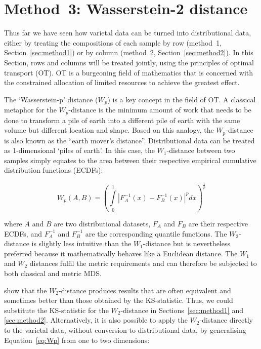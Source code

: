 \documentclass{article}
\begin{document}
\section{Method~3: Wasserstein-2 distance}\label{sec:method3}

Thus far we have seen how varietal data can be turned into
distributional data, either by treating the compositions of each
sample by row (method~1, Section~\ref{sec:method1}) or by column
(method~2, Section~\ref{sec:method2}). In this Section, rows and
columns will be treated jointly, using the principles of optimal
transport (OT). OT is a burgeoning field of mathematics that is
concerned with the constrained allocation of limited resources to
achieve the greatest effect.\medskip

The `Wasserstein-p' distance ($W_p$) is a key concept in the field of
OT. A classical metaphor for the $W_p$-distance is the minimum amount
of work that needs to be done to transform a pile of earth into a
different pile of earth with the same volume but different location
and shape. Based on this analogy, the $W_p$-distance is also known as
the ``earth mover's distance''. Distributional data can be treated as
1-dimensional `piles of earth'. In this case, the $W_1$-distance
between two samples simply equates to the area between their
respective empirical cumulative distribution functions (ECDFs):

\begin{equation}
  W_p(A,B) = \left(\int\limits_{0}^{1}
  \left|F_A^{-1}(x)-F_B^{-1}(x)\right|^p dx
  \right)^{\frac{1}{p}}
  \label{eq:Wp}
\end{equation}

\noindent where $A$ and $B$ are two distributional datasets, $F_A$ and
$F_B$ are their respective ECDFs, and $F_A^{-1}$ and $F_B^{-1}$ are
the corresponding quantile functions. The $W_2$-distance is slightly
less intuitive than the $W_1$-distance but is nevertheless preferred
because it mathematically behaves like a Euclidean distance. The $W_1$
and $W_2$ distances fulfil the metric requirements and can therefore
be subjected to both classical and metric MDS.\medskip

 show that the $W_2$-distance produces results that
are often equivalent and sometimes better than those obtained by the
KS-statistic.  Thus, we could substitute the KS-statistic for the
$W_2$-distance in Sections~\ref{sec:method1} and
\ref{sec:method2}. Alternatively, it is also possible to apply the
$W_2$-distance directly to the varietal data, without conversion to
distributional data, by generalising Equation~\ref{eq:Wp} from one to
two dimensions:
\end{document}
